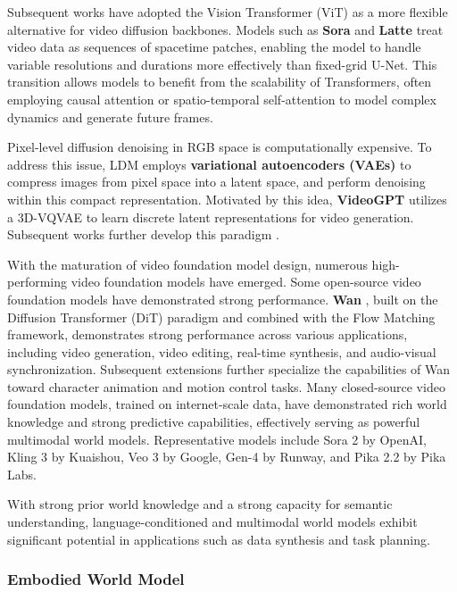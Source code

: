 Subsequent works have adopted the Vision Transformer (ViT) \cite{ViT} as a more flexible alternative for video diffusion backbones. Models such as \textbf{Sora} \cite{Sora} and \textbf{Latte} \cite{Latte} treat video data as sequences of spacetime patches, enabling the model to handle variable resolutions and durations more effectively than fixed-grid U-Net. This transition allows models to benefit from the scalability of Transformers, often employing causal attention or spatio-temporal self-attention to model complex dynamics and generate future frames.

Pixel-level diffusion denoising in RGB space is computationally expensive. To address this issue, LDM \cite{LDM} employs \textbf{variational autoencoders (VAEs)} to compress images from pixel space into a latent space, and perform denoising within this compact representation. Motivated by this idea, \textbf{VideoGPT} \cite{VideoGPT} utilizes a 3D-VQVAE to learn discrete latent representations for video generation. Subsequent works further develop this paradigm \cite{Align_Your_Latents, MAGVIT, Movie-Gen, Latte, CogVideoX, LTX-Video}.

With the maturation of video foundation model design, numerous high-performing video foundation models have emerged.
Some open-source video foundation models have demonstrated strong performance. \textbf{Wan} \cite{Wan}, built on the Diffusion Transformer (DiT) paradigm and combined with the Flow Matching framework, demonstrates strong performance across various applications, including video generation, video editing, real-time synthesis, and audio-visual synchronization. Subsequent extensions further specialize the capabilities of Wan toward character animation \cite{Wan-Animate} and motion control \cite{Wan-Move} tasks.
Many closed-source video foundation models, trained on internet-scale data, have demonstrated rich world knowledge and strong predictive capabilities, effectively serving as powerful multimodal world models. Representative models include Sora 2 \cite{Sora_2} by OpenAI, Kling 3 \cite{kling3} by Kuaishou, Veo 3 \cite{Veo_3} by Google, Gen-4 \cite{Gen_4} by Runway, and Pika 2.2 \cite{Pika-22} by Pika Labs.

With strong prior world knowledge and a strong capacity for semantic understanding, language-conditioned and multimodal world models exhibit significant potential in applications such as data synthesis and task planning.


\subsubsection{Embodied World Model}
\label{Embodied}


